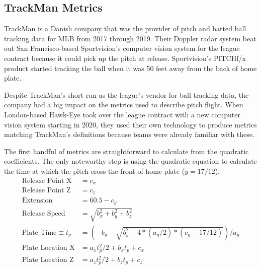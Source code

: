 \documentclass{article}
\begin{document}
  \subsection{\sc TrackMan Metrics}

    TrackMan is a Danish company that was the provider of pitch and batted ball tracking data for MLB from 2017 through 2019. Their Doppler radar system beat out San Francisco-based Sportvision's computer vision system for the league contract because it could pick up the pitch at release. Sportvision's PITCHf/x product started tracking the ball when it was 50 feet away from the back of home plate.

    Despite TrackMan's short run as the league's vendor for ball tracking data, the company had a big impact on the metrics used to describe pitch flight. When London-based Hawk-Eye took over the league contract with a new computer vision system starting in 2020, they used their own technology to produce metrics matching TrackMan's definitions because teams were already familiar with these.

    The first handful of metrics are straightforward to calculate from the quadratic coefficients. The only noteworthy step is using the quadratic equation to calculate the time at which the pitch cross the front of home plate ($y = 17/12$).
    \begin{align*}
      \mbox{Release Point X} &= c_x\\
      \mbox{Release Point Z} &= c_z\\
      \mbox{Extension} &= 60.5 - c_y\\
      \mbox{Release Speed} &= \sqrt{b_x^2 + b_y^2 + b_z^2}\\
      \mbox{Plate Time} \equiv t_p &= \left(-b_y - \sqrt{b_y^2 - 4 * (a_y / 2) * (c_y - 17 / 12)}\right) / a_y\\
      \mbox{Plate Location X} &= a_x t_p^2 / 2 + b_x t_p + c_x\\
      \mbox{Plate Location Z} &= a_z t_p^2 / 2 + b_z t_p + c_z
    \end{align*}
\end{document}
